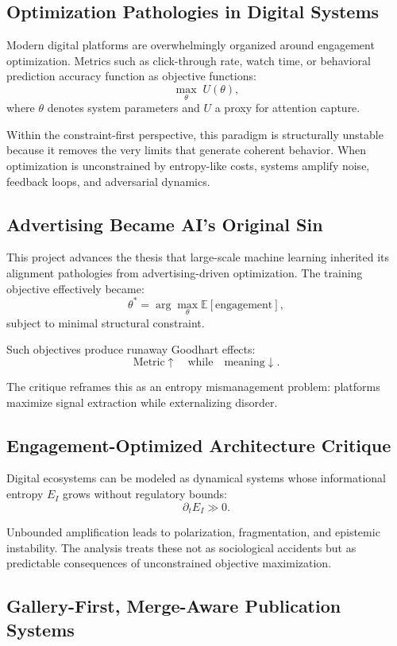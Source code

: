\documentclass[12pt]{article}
\begin{document}
\subsection{Optimization Pathologies in Digital Systems}

Modern digital platforms are overwhelmingly organized around engagement optimization. Metrics such as click-through rate, watch time, or behavioral prediction accuracy function as objective functions:
\[
\max_{\theta} \; U(\theta),
\]
where $\theta$ denotes system parameters and $U$ a proxy for attention capture.

Within the constraint-first perspective, this paradigm is structurally unstable because it removes the very limits that generate coherent behavior. When optimization is unconstrained by entropy-like costs, systems amplify noise, feedback loops, and adversarial dynamics.

\subsection{Advertising Became AI's Original Sin}

This project advances the thesis that large-scale machine learning inherited its alignment pathologies from advertising-driven optimization. The training objective effectively became:
\[
\theta^\ast = \arg\max_\theta \mathbb{E}[\text{engagement}],
\]
subject to minimal structural constraint.

Such objectives produce runaway Goodhart effects:
\[
\text{Metric} \uparrow \quad \text{while} \quad \text{meaning} \downarrow.
\]

The critique reframes this as an entropy mismanagement problem: platforms maximize signal extraction while externalizing disorder.

\subsection{Engagement-Optimized Architecture Critique}

Digital ecosystems can be modeled as dynamical systems whose informational entropy $E_I$ grows without regulatory bounds:
\[
\partial_t E_I \gg 0.
\]

Unbounded amplification leads to polarization, fragmentation, and epistemic instability. The analysis treats these not as sociological accidents but as predictable consequences of unconstrained objective maximization.

\subsection{Gallery-First, Merge-Aware Publication Systems}
\end{document}
